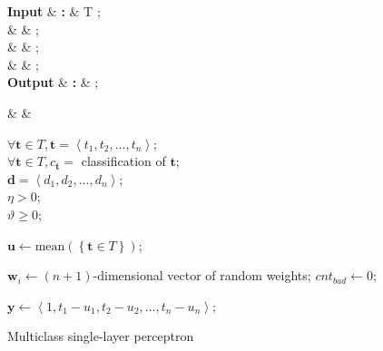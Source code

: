\documentclass[twoside]{IEEEtran}
\begin{document}
\begin{figure}[!t]
    \centering
    \setlength{\intextsep}{0pt}

    \begin{algorithm}[H]
        \caption{Multiclass single-layer perceptron}

        \begin{flalign*}
            \setlength{\arraycolsep}{0pt}
            \begin{matrix*}[l]
                \textbf{Input}  & \textbf{: } & T ;          \\
                \text{}         &           &  ;           \\
                \text{}         &           & \eta {};                   \\
                \text{}         &           & \vartheta {}; \\
                \textbf{Output} & \textbf{: } &  ;
            \end{matrix*} &  &
        \end{flalign*}
        \begin{algorithmic}
            \Require%
            \( \forall \mathbf{t} \in T, \mathbf{t} = \left<t_1, t_2, \dots, t_n\right> \); \\
            \( \forall \mathbf{t} \in T, c_\mathbf{t} = \) classification of \( \mathbf{t} \); \\
            \( \mathbf{d} = \left<d_1, d_2, \dots, d_n\right>; \) \\
            \( \eta > 0 \); \\
            \( \vartheta \geq 0 \);

            \State{}

            \State%
            \( \mathbf{u} \gets \mathrm{mean}\left(\left \{ \mathbf{t} \in T \right \}\right) \);

                \State%
                \( \mathbf{w}_i \gets \left(n + 1\right) \)-dimensional vector of random weights;
            \EndFor%
                \State%
                \( cnt_{bad} \gets 0 \);

                    \State%
                    \( \mathbf{y} \gets \left<1, t_1 - u_1, t_2 - u_2, \dots, t_n - u_n\right> \);


\end{algorithmic}
\end{algorithm}
\end{figure}
\end{document}
